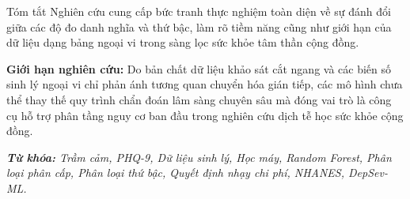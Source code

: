 \documentclass{uetgraduation}
\begin{document}
\begin{preamble}{Tóm tắt}
Nghiên cứu cung cấp bức tranh thực nghiệm toàn diện về sự đánh đổi giữa các độ đo danh nghĩa và thứ bậc, làm rõ tiềm năng cũng như giới hạn của dữ liệu dạng bảng ngoại vi trong sàng lọc sức khỏe tâm thần cộng đồng.

\textbf{Giới hạn nghiên cứu:} Do bản chất dữ liệu khảo sát cắt ngang và các biến số sinh lý ngoại vi chỉ phản ánh tương quan chuyển hóa gián tiếp, các mô hình chưa thể thay thế quy trình chẩn đoán lâm sàng chuyên sâu mà đóng vai trò là công cụ hỗ trợ phân tầng nguy cơ ban đầu trong nghiên cứu dịch tễ học sức khỏe cộng đồng.

\vspace{0.6cm}
\noindent \textit{\textbf{Từ khóa:} Trầm cảm, PHQ-9, Dữ liệu sinh lý, Học máy, Random Forest, Phân loại phân cấp, Phân loại thứ bậc, Quyết định nhạy chi phí, NHANES, DepSev-ML.}
\end{preamble}
\end{document}
